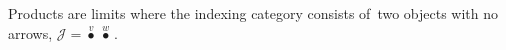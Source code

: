 Products are limits where the indexing category consists of \,two objects with no arrows, $\mathcal{J}=\boxed{\overset{v}\bullet\ \overset{w}\bullet}$\,.
